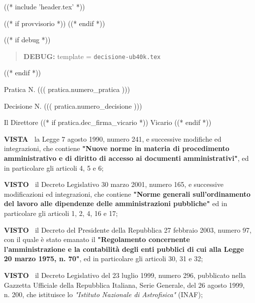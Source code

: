 
((* include 'header.tex' *))

((* if provvisorio *))
((* endif *))


\topaddr

((* if debug *))
\begin{quotation}
	\textbf{DEBUG:} template = \texttt{decisione-ub40k.tex}
\end{quotation}
((* endif *))

Pratica N. ((( pratica.numero_pratica )))

\begin{flushright}
Decisione N. ((( pratica.numero_decisione )))
\end{flushright}

\begin{center}

Il Direttore ((* if pratica.dec_firma_vicario *)) Vicario ((* endif *))

\end{center}
\textbf{VISTA~}	la Legge 7 agosto 1990, numero 241, e successive modifiche
ed integrazioni, che contiene \textbf{"Nuove norme in materia di procedimento
amministrativo e di diritto di accesso ai documenti amministrativi"},
ed in particolare gli articoli 4, 5 e 6;

\textbf{VISTO~}	il Decreto Legislativo 30 marzo 2001, numero 165, e
successive modificazioni ed integrazioni, che contiene \textbf{"Norme generali
sull'ordinamento del lavoro alle dipendenze delle amministrazioni
pubbliche"} ed in particolare gli articoli 1, 2, 4, 16 e 17;

\textbf{VISTO~}	il Decreto del Presidente della Repubblica 27 febbraio
2003, numero 97, con il quale è stato emanato il \textbf{"Regolamento concernente
l'amministrazione e la contabilità degli enti pubblici di cui alla
Legge 20 marzo 1975, n. 70"}, ed in particolare gli articoli 30, 31 e 32;

\textbf{VISTO~}	il Decreto Legislativo del 23 luglio 1999, numero 296,
pubblicato nella Gazzetta Ufficiale della Repubblica Italiana, Serie
Generale, del 26 agosto 1999, n. 200, che istituisce lo \textit{"Istituto
Nazionale di Astrofisica"} (INAF);

